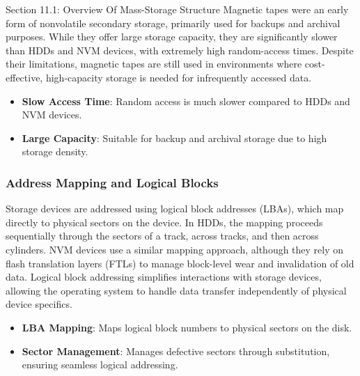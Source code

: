 \begin{notes}{Section 11.1: Overview Of Mass-Storage Structure}
    Magnetic tapes were an early form of nonvolatile secondary storage, primarily used for backups and archival purposes. While they offer large storage capacity, they are significantly slower than HDDs 
    and NVM devices, with extremely high random-access times. Despite their limitations, magnetic tapes are still used in environments where cost-effective, high-capacity storage is needed for infrequently 
    accessed data.
    
    \begin{highlight}
    
        \begin{itemize}
            \item \textbf{Slow Access Time}: Random access is much slower compared to HDDs and NVM devices.
            \item \textbf{Large Capacity}: Suitable for backup and archival storage due to high storage density.
        \end{itemize}
    
    \end{highlight}

    \subsubsection*{Address Mapping and Logical Blocks}
    
    Storage devices are addressed using logical block addresses (LBAs), which map directly to physical sectors on the device. In HDDs, the mapping proceeds sequentially through the sectors of a track, 
    across tracks, and then across cylinders. NVM devices use a similar mapping approach, although they rely on flash translation layers (FTLs) to manage block-level wear and invalidation of old data. 
    Logical block addressing simplifies interactions with storage devices, allowing the operating system to handle data transfer independently of physical device specifics.
    
    \begin{highlight}
    
        \begin{itemize}
            \item \textbf{LBA Mapping}: Maps logical block numbers to physical sectors on the disk.
            \item \textbf{Sector Management}: Manages defective sectors through substitution, ensuring seamless logical addressing.
        \end{itemize}
    

\end{highlight}
\end{notes}
